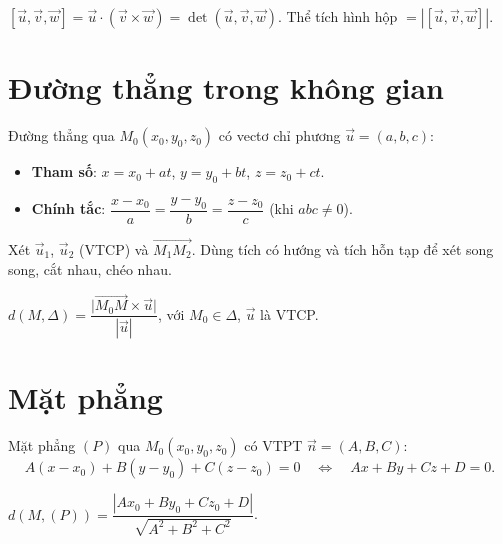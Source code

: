 \documentclass[12pt,a4paper]{article}
\begin{document}
\begin{congthuc}[title={Tích hỗn tạp}]
  $[\vec{u}, \vec{v}, \vec{w}] = \vec{u} \cdot (\vec{v} \times \vec{w}) = \det(\vec{u}, \vec{v}, \vec{w})$. Thể tích hình hộp $= |[\vec{u}, \vec{v}, \vec{w}]|$.
\end{congthuc}

\section{Đường thẳng trong không gian}

\begin{dinhnghia}
  Đường thẳng qua $M_0(x_0, y_0, z_0)$ có vectơ chỉ phương $\vec{u} = (a, b, c)$:
  \begin{itemize}
    \item \textbf{Tham số}: $x = x_0 + at$, $y = y_0 + bt$, $z = z_0 + ct$.
    \item \textbf{Chính tắc}: $\dfrac{x - x_0}{a} = \dfrac{y - y_0}{b} = \dfrac{z - z_0}{c}$ (khi $abc \ne 0$).
  \end{itemize}
\end{dinhnghia}

\begin{phuongphap}[title={Vị trí tương đối hai đường thẳng}]
  Xét $\vec{u}_1$, $\vec{u}_2$ (VTCP) và $\overrightarrow{M_1M_2}$. Dùng tích có hướng và tích hỗn tạp để xét song song, cắt nhau, chéo nhau.
\end{phuongphap}

\begin{congthuc}[title={Khoảng cách từ điểm đến đường thẳng}]
  $d(M, \Delta) = \dfrac{\bigl|\overrightarrow{M_0M} \times \vec{u}\bigr|}{|\vec{u}|}$, với $M_0 \in \Delta$, $\vec{u}$ là VTCP.
\end{congthuc}

\section{Mặt phẳng}

\begin{dinhnghia}
  Mặt phẳng $(P)$ qua $M_0(x_0, y_0, z_0)$ có VTPT $\vec{n} = (A, B, C)$:
  \[
    A(x - x_0) + B(y - y_0) + C(z - z_0) = 0 \quad \Leftrightarrow \quad Ax + By + Cz + D = 0.
  \]
\end{dinhnghia}

\begin{congthuc}[title={Khoảng cách từ điểm đến mặt phẳng}]
  $d(M, (P)) = \dfrac{|Ax_0 + By_0 + Cz_0 + D|}{\sqrt{A^2 + B^2 + C^2}}$.
\end{congthuc}
\end{document}
